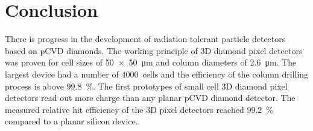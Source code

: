\section{Conclusion}
There is progress in the development of radiation tolerant particle detectors based on \ac{pCVD} diamonds. The working principle of 3D diamond pixel detectors was proven for cell sizes of \SI{50x50}{\micro\meter} and column diameters of \SI{2.6}{\micro\meter}. The largest device had a number of \SI{4000}{cells} and the efficiency of the column drilling process is above \SI{99.8}{\%}. The first prototypes of small cell 3D diamond pixel detectors read out more charge than any planar \ac{pCVD} diamond detector. The measured relative hit efficiency of the 3D pixel detectors reached \SI{99.2}{\%} compared to a planar silicon device.\par